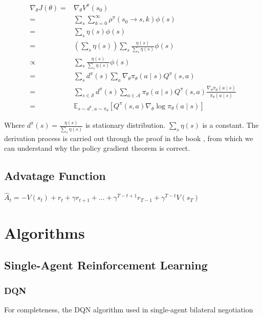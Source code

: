 \begin{appendices}
	\begin{equation}
	\begin{aligned}
	\nabla_{\theta} J(\theta)=&\nabla_{\theta} V^{\pi}\left(s_{0}\right) \\
	=& \sum_{s} \sum_{k=0}^{\infty} \rho^{\pi}\left(s_{0} \rightarrow s, k\right) \phi(s) \\
	=& \sum_{s} \eta(s) \phi(s) \\
	=& \left(\sum_{s} \eta(s)\right) \sum_{s} \frac{\eta(s)}{\sum_{s} \eta(s)} \phi(s) \\
	\propto&  \sum_{s} \frac{\eta(s)}{\sum_{s} \eta(s)} \phi(s) \\
	=& \sum_{s} d^{\pi}(s) \sum_{a} \nabla_{\theta} \pi_{\theta}(a \mid s) Q^{\pi}(s, a) \\
	=& \sum_{s \in \mathcal{S}} d^{\pi}(s) \sum_{a \in \mathcal{A}} \pi_{\theta}(a \mid s) Q^{\pi}(s, a) \frac{\nabla_{\theta} \pi_{\theta}(a \mid s)}{\pi_{\theta}(a \mid s)} \\
	=& \mathbb{E}_{s \sim d^{\pi}, a \sim \pi_{\theta}}\left[Q^{\pi}(s, a) \nabla_{\theta} \log \pi_{\theta}(a \mid s)\right]
	\end{aligned}
	\end{equation}
	
	Where $d^{\pi}(s)=\frac{\eta(s)}{\sum_{s} \eta(s)}$ is stationary distribution. $\sum_{s} \eta(s)$ is a constant. The derivation process is carried out through the proof in the book \parencite{Sutton2018}, from which we can understand why the policy gradient theorem is correct. 
	
	\section{Advatage Function}
	$\hat{A}_t = - V(s_t) + r_t + \gamma r_{t+1} + \dots + \gamma^{T-t+1}r_{T-1} + \gamma^{T-t}V(s_T)$
  
	\chapter{Algorithms} \label{appendices-algorithms}
  \section{Single-Agent Reinforcement Learning}
	\subsection{DQN} \label{appendix:dqn}
	For completeness, the DQN algorithm used in single-agent bilateral negotiation
	

\end{appendices}
